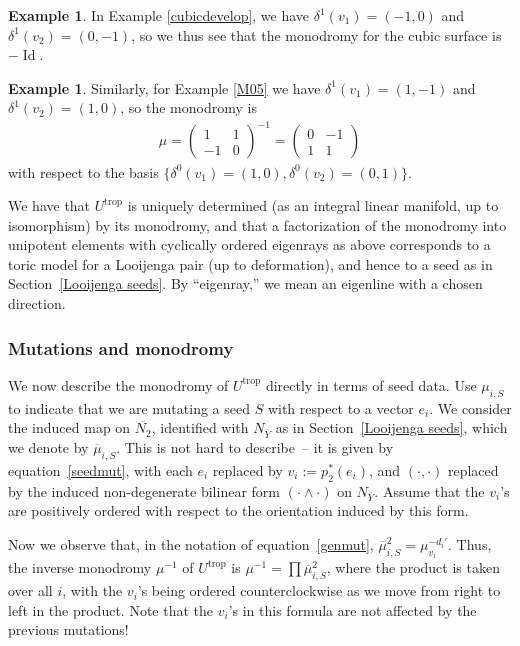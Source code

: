 \documentclass[10pt,a4paper]{amsart}
\numberwithin{equation}{section}
\numberwithin{figure}{section}
\numberwithin{table}{section}
\DeclareMathOperator{\id}{Id}
\DeclareMathOperator{\trop}{trop}
\let\?=\overline
\theoremstyle{definition}
\newtheorem{eg}[thm]{Example}
\begin{document}
\begin{eg}In Example \ref{cubicdevelop}, we have $\delta^1(v_1) = (-1,0)$ and $\delta^1(v_2) = (0,-1)$, so we thus see that the monodromy for the cubic surface is $-\id$.
\end{eg}

\begin{eg} \label{M05 mono}Similarly, for Example \ref{M05} we have $\delta^1(v_1) = (1,-1)$ and $\delta^1(v_2) = (1,0)$, so the monodromy is
\begin{gather*}
	\mu= \left(\begin{matrix}
		1 &1 \\
		-1 &0
		\end{matrix}\right)^{-1} =
		\left(\begin{matrix}
		0 &-1 \\
		1 &1
		\end{matrix}\right)
\end{gather*}
with respect to the basis $\big\{ \delta^0(v_1) = (1,0) , \delta^0(v_2) = (0,1) \big\}$.
\end{eg}

We have that $U^{\trop}$ is uniquely determined (as an integral linear manifold, up to isomorphism)
 by its monodromy, and that a factorization of the monodromy into unipotent elements with cyclically ordered eigenrays as above corresponds to a toric model for a Looijenga pair (up to deformation), and hence to a seed as in Section~\ref{Looijenga seeds}. By ``eigenray,'' we mean an eigenline with a chosen direction.

\subsubsection{Mutations and monodromy}\label{mutmono}

We now describe the monodromy of $U^{\trop}$ directly in terms of seed data. Use $\mu_{i,S}$ to indicate that we are mutating a seed $S$ with respect to a vector $e_i$. We consider the induced map on $\?{N_2}$, identified with $N_{\?{Y}}$ as in Section~\ref{Looijenga seeds}, which we denote by $\?{\mu}_{i,S}$. This is not hard to describe~-- it is given by equation~\eqref{seedmut}, with each $e_i$ replaced by $v_i:=p_2^*(e_i)$, and $(\cdot,\cdot)$ replaced by the induced non-degenerate bilinear form $(\cdot\wedge\cdot)$ on $N_{\?{Y}}$.
 Assume that the $v_i$'s are positively ordered with respect to the orientation induced by this form.

Now we observe that, in the notation of equation~\eqref{genmut}, $\?{\mu}_{i,S}^2=\mu_{v_i}^{-d_i'}$. Thus, the inverse monodromy $\mu^{-1}$ of $U^{\trop}$ is $\mu^{-1}= \prod \?{\mu}_{i,S}^2$, where the product is taken over all $i$, with the $v_i$'s being ordered counterclockwise as we move from right to left in the product. Note that the $v_i$'s in this formula are not affected by the previous mutations!
\end{document}
